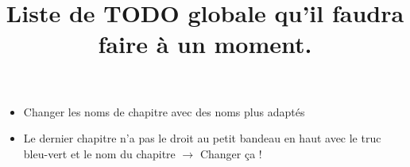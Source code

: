 \documentclass[10pt,a4paper]{article}
\title{Liste de TODO globale qu'il faudra faire à un moment. }
\author{}
\begin{document}
\maketitle

\begin{itemize}

	\item Changer les noms de chapitre avec des noms plus adaptés
	
	\item Le dernier chapitre n'a pas le droit au petit bandeau en haut avec le truc bleu-vert et le nom du chapitre $\rightarrow$ Changer ça ! 



\end{itemize}
\end{document}
